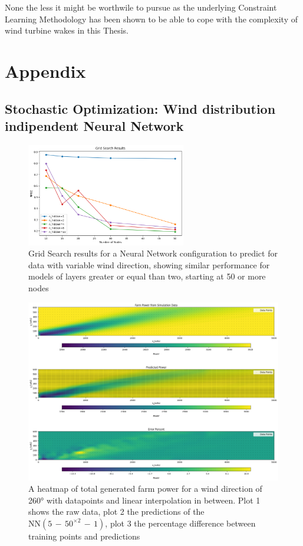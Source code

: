 \documentclass[preprint,12pt]{elsarticle}
\begin{document}
None the less it might be worthwile to pursue as the underlying Constraint Learning Methodology has been shown to be able to cope with the complexity of wind turbine wakes in this Thesis.


\section{Appendix}\label{chapter:Appendix}

\subsection{Stochastic Optimization: Wind distribution indipendent Neural Network}

\begin{figure}[h] 
	\centering
	\includegraphics[width=0.62\textwidth]{../figures/optimization/prob_nn_opti.png} 
	\caption{Grid Search results for a Neural Network configuration to predict for data with variable wind direction, showing similar performance for models of layers greater or equal than two, starting at 50 or more nodes}
	\label{fig:determ_nn_opti}
\end{figure}


\begin{figure}[h] 
	\centering
	\includegraphics[width=1\textwidth]{../figures/optimization/prob_model_colormap.png} 
	\caption{A heatmap of total generated farm power for a wind direction of 260° with datapoints and linear interpolation in between. Plot 1 shows the raw data, plot 2 the predictions of the $\text{NN}(5\,{-}\,50^{\times2}\,{-}\,1)$, plot 3 the percentage difference between training points and predictions}
	\label{fig:prob_model_colormap}
\end{figure}
\end{document}
